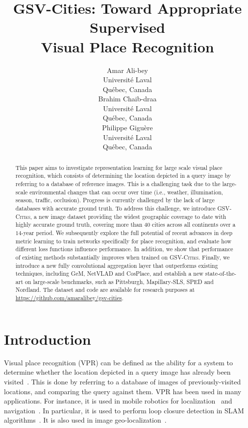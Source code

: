 \documentclass{article}
\title{GSV-Cities: Toward Appropriate Supervised \\Visual Place Recognition}
\author{ Amar Ali-bey\\
	Universit\'e Laval\\
	Qu\'ebec, Canada \\
	\And
	Brahim Chaib-draa \\
	Universit\'e Laval\\
	Qu\'ebec, Canada \\
	\And
	Philippe Gigu\`ere \\
	Universit\'e Laval \\
	Qu\'ebec, Canada \\
}
\date{}
\begin{document}
\maketitle

\begin{abstract}
This paper aims to investigate representation learning for large scale  visual place recognition, which consists of determining the location depicted in a query image by referring to a database of reference images. This is a challenging task due to the large-scale environmental changes that can occur over time (i.e., weather, illumination, season, traffic, occlusion). Progress is currently challenged by the lack of large databases with accurate ground truth. To address this challenge, we introduce \textsc{GSV-Cities}, a new image dataset providing the widest geographic coverage to date with highly accurate ground truth, covering more than $40$ cities across all continents over a $14$-year period.
We subsequently explore the full potential of recent advances in deep metric learning to train networks specifically for place recognition, and evaluate how different loss functions influence performance. In addition, we show that performance of existing methods substantially improves when trained on \textsc{GSV-Cities}.
Finally, we introduce a new fully convolutional aggregation layer that outperforms existing techniques, including GeM, NetVLAD and CosPlace, and establish a new state-of-the-art on large-scale benchmarks, such as Pittsburgh, Mapillary-SLS, SPED and Nordland. 
The dataset and code are available for research purposes at \url{https://github.com/amaralibey/gsv-cities}.
\end{abstract}

\vspace{15pt}

\vspace{15pt}
\section{Introduction}
Visual place recognition (VPR) can be defined as the ability for a system to determine whether the location depicted in a query image has already been visited~\cite{arandjelovic2016netvlad}.
This is done by referring to a database of images of previously-visited locations, and comparing the query against them.
VPR has been used in many applications. For instance, it is used in mobile robotics for localization~\cite{engelson1994passive, mur2015orb} and  navigation~\cite{matsumoto1996visual, milford2010persistent}. In particular, it is used to perform loop closure detection in SLAM algorithms~\cite{taketomi2017visual, hane20173d}. 
It is also used in image geo-localization~\cite{weyand2016planet}.
\end{document}

